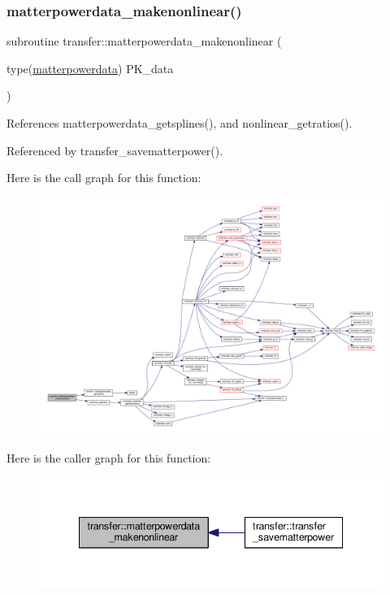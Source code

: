 \subsubsection{\texorpdfstring{matterpowerdata\+\_\+makenonlinear()}{matterpowerdata\_makenonlinear()}}
{\footnotesize\ttfamily subroutine transfer\+::matterpowerdata\+\_\+makenonlinear (\begin{DoxyParamCaption}\item[{type(\mbox{\hyperlink{structtransfer_1_1matterpowerdata}{matterpowerdata}})}]{P\+K\+\_\+data }\end{DoxyParamCaption})}



References matterpowerdata\+\_\+getsplines(), and nonlinear\+\_\+getratios().



Referenced by transfer\+\_\+savematterpower().

Here is the call graph for this function\+:
\nopagebreak
\begin{figure}[H]
\begin{center}
\leavevmode
\includegraphics[width=350pt]{namespacetransfer_a113eb04b73dbf4222ca5a7e88eea5528_cgraph}
\end{center}
\end{figure}
Here is the caller graph for this function\+:
\nopagebreak
\begin{figure}[H]
\begin{center}
\leavevmode
\includegraphics[width=342pt]{namespacetransfer_a113eb04b73dbf4222ca5a7e88eea5528_icgraph}
\end{center}
\end{figure}
\mbox{\label{namespacetransfer_a890cb72b18bbeb6b973f55ac477250e2}} 
